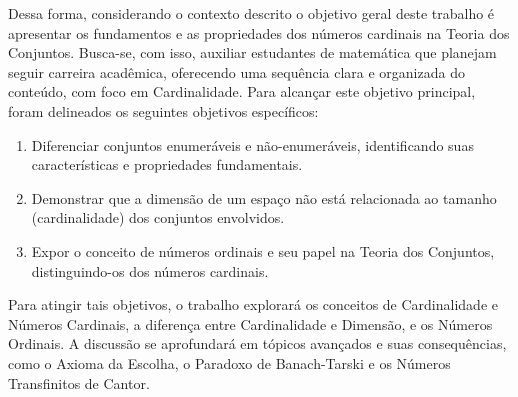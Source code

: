 Dessa forma, considerando o contexto descrito o objetivo geral deste trabalho é apresentar os fundamentos e as propriedades dos números cardinais na Teoria dos Conjuntos. Busca-se, com isso, auxiliar estudantes de matemática que planejam seguir carreira acadêmica, oferecendo uma sequência clara e organizada do conteúdo, com foco em Cardinalidade. Para alcançar este objetivo principal, foram delineados os seguintes objetivos específicos:
\begin{enumerate}
    \item Diferenciar conjuntos enumeráveis e não-enumeráveis, identificando suas características e propriedades fundamentais.
    \item Demonstrar que a dimensão de um espaço não está relacionada ao tamanho (cardinalidade) dos conjuntos envolvidos.
    \item Expor o conceito de números ordinais e seu papel na Teoria dos Conjuntos, distinguindo-os dos números cardinais.
\end{enumerate}

Para atingir tais objetivos, o trabalho explorará os conceitos de Cardinalidade e Números Cardinais, a diferença entre Cardinalidade e Dimensão, e os Números Ordinais. A discussão se aprofundará em tópicos avançados e suas consequências, como o Axioma da Escolha, o Paradoxo de Banach-Tarski e os Números Transfinitos de Cantor.






